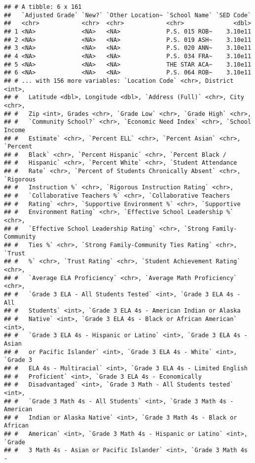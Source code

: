 \documentclass[]{article}
\begin{document}
\begin{verbatim}
## # A tibble: 6 x 161
##   `Adjusted Grade` `New?` `Other Location~ `School Name` `SED Code`
##   <chr>            <chr>  <chr>            <chr>              <dbl>
## 1 <NA>             <NA>   <NA>             P.S. 015 ROB~    3.10e11
## 2 <NA>             <NA>   <NA>             P.S. 019 ASH~    3.10e11
## 3 <NA>             <NA>   <NA>             P.S. 020 ANN~    3.10e11
## 4 <NA>             <NA>   <NA>             P.S. 034 FRA~    3.10e11
## 5 <NA>             <NA>   <NA>             THE STAR ACA~    3.10e11
## 6 <NA>             <NA>   <NA>             P.S. 064 ROB~    3.10e11
## # ... with 156 more variables: `Location Code` <chr>, District <int>,
## #   Latitude <dbl>, Longitude <dbl>, `Address (Full)` <chr>, City <chr>,
## #   Zip <int>, Grades <chr>, `Grade Low` <chr>, `Grade High` <chr>,
## #   `Community School?` <chr>, `Economic Need Index` <chr>, `School Income
## #   Estimate` <chr>, `Percent ELL` <chr>, `Percent Asian` <chr>, `Percent
## #   Black` <chr>, `Percent Hispanic` <chr>, `Percent Black /
## #   Hispanic` <chr>, `Percent White` <chr>, `Student Attendance
## #   Rate` <chr>, `Percent of Students Chronically Absent` <chr>, `Rigorous
## #   Instruction %` <chr>, `Rigorous Instruction Rating` <chr>,
## #   `Collaborative Teachers %` <chr>, `Collaborative Teachers
## #   Rating` <chr>, `Supportive Environment %` <chr>, `Supportive
## #   Environment Rating` <chr>, `Effective School Leadership %` <chr>,
## #   `Effective School Leadership Rating` <chr>, `Strong Family-Community
## #   Ties %` <chr>, `Strong Family-Community Ties Rating` <chr>, `Trust
## #   %` <chr>, `Trust Rating` <chr>, `Student Achievement Rating` <chr>,
## #   `Average ELA Proficiency` <chr>, `Average Math Proficiency` <chr>,
## #   `Grade 3 ELA - All Students Tested` <int>, `Grade 3 ELA 4s - All
## #   Students` <int>, `Grade 3 ELA 4s - American Indian or Alaska
## #   Native` <int>, `Grade 3 ELA 4s - Black or African American` <int>,
## #   `Grade 3 ELA 4s - Hispanic or Latino` <int>, `Grade 3 ELA 4s - Asian
## #   or Pacific Islander` <int>, `Grade 3 ELA 4s - White` <int>, `Grade 3
## #   ELA 4s - Multiracial` <int>, `Grade 3 ELA 4s - Limited English
## #   Proficient` <int>, `Grade 3 ELA 4s - Economically
## #   Disadvantaged` <int>, `Grade 3 Math - All Students tested` <int>,
## #   `Grade 3 Math 4s - All Students` <int>, `Grade 3 Math 4s - American
## #   Indian or Alaska Native` <int>, `Grade 3 Math 4s - Black or African
## #   American` <int>, `Grade 3 Math 4s - Hispanic or Latino` <int>, `Grade
## #   3 Math 4s - Asian or Pacific Islander` <int>, `Grade 3 Math 4s -

\end{verbatim}
\end{document}
